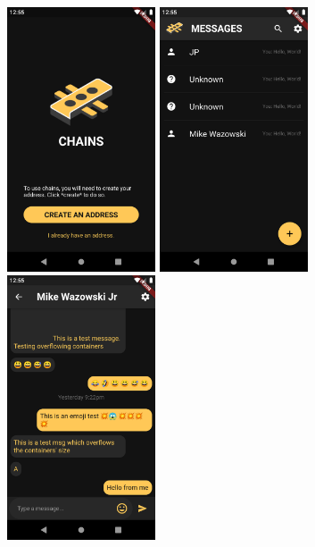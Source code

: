 \documentclass{article}
\begin{document}
\noindent
\begin{center}
\includegraphics[width=0.33\textwidth]{Images/chains_1.png}\hspace{0.1\textwidth}%
\includegraphics[width=0.33\textwidth]{Images/chains_2.png}\\[2em]
\includegraphics[width=0.33\textwidth]{Images/chains_3.png}\hspace{0.1\textwidth}%

\end{center}
\end{document}
